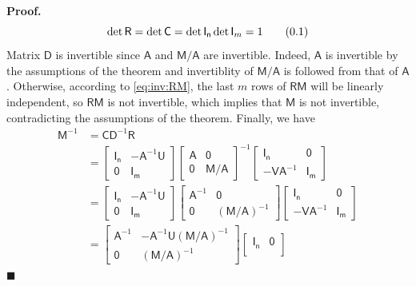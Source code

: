 \documentclass[10pt]{article}
\theoremstyle{definition}
\newenvironment{prf}{\noindent\textbf{Proof.}}{\hfill$\blacksquare$}
\newcommand\eqnum{\addtocounter{equation}{1}\tag{\arabic{section}.\arabic{equation}}}
\begin{document}
\begin{prf}
\begin{equation}
\det\mathsf{R} = \det\mathsf{C} = \det\mathsf{I_n}\det\mathsf{I}_m = 1
\eqnum
\label{eq:det:RC}
\end{equation}
Matrix $\mathsf{D}$ is invertible since $\mathsf{A}$ and $\mathsf{M}/\mathsf{A}$ are invertible. Indeed, $\mathsf{A}$ is invertible by the assumptions of the theorem and invertiblity of $\mathsf{M}/\mathsf{A}$ is followed from that of $\mathsf{A}$. Otherwise, according to \cref{eq:inv:RM}, the last $m$ rows of $\mathsf{R}\mathsf{M}$ will be linearly independent, so $\mathsf{R}\mathsf{M}$ is not invertible, which implies that $\mathsf{M}$ is not invertible, contradicting the assumptions of the theorem. Finally, we have
\begin{align*}
\mathsf{M}^{-1} &= \mathsf{C}\mathsf{D}^{-1}\mathsf{R} \\
&= 
\begin{bmatrix}
\mathsf{I_n} & -\mathsf{A}^{-1}\mathsf{U} \\
\mathsf{0} & \mathsf{I_m}
\end{bmatrix}
\begin{bmatrix}
\mathsf{A} & \mathsf{0} \\
\mathsf{0} & \mathsf{M}/\mathsf{A}
\end{bmatrix}^{-1}
\begin{bmatrix}
\mathsf{I_n} & \mathsf{0} \\
-\mathsf{V}\mathsf{A}^{-1} & \mathsf{I_m}
\end{bmatrix} \\ &=
\begin{bmatrix}
\mathsf{I_n} & -\mathsf{A}^{-1}\mathsf{U} \\
\mathsf{0} & \mathsf{I_m}
\end{bmatrix}
\begin{bmatrix}
\mathsf{A}^{-1} & \mathsf{0} \\
\mathsf{0} & (\mathsf{M}/\mathsf{A})^{-1}
\end{bmatrix}
\begin{bmatrix}
\mathsf{I_n} & \mathsf{0} \\
-\mathsf{V}\mathsf{A}^{-1} & \mathsf{I_m}
\end{bmatrix} \\ &=
\begin{bmatrix}
\mathsf{A}^{-1} & -\mathsf{A}^{-1}\mathsf{U}(\mathsf{M}/\mathsf{A})^{-1} \\
\mathsf{0} & (\mathsf{M}/\mathsf{A})^{-1}
\end{bmatrix}
\begin{bmatrix}
\mathsf{I_n} & \mathsf{0} \\

\end{bmatrix}
\end{align*}
\end{prf}
\end{document}
